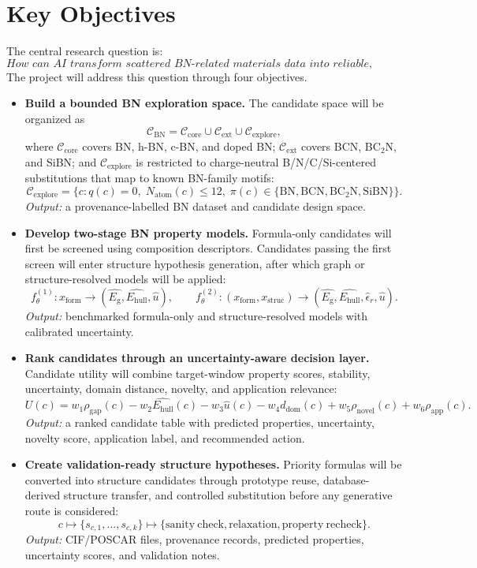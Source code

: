 \documentclass[10pt,a4paper]{article}
\newcommand{\eg}{E_{\mathrm{g}}}
\newcommand{\ehull}{E_{\mathrm{hull}}}
\newcommand{\form}{x_{\mathrm{form}}}
\newcommand{\struc}{x_{\mathrm{struc}}}
\newcommand{\unc}{u}
\newcommand{\domain}{d_{\mathrm{dom}}}
\newcommand{\utility}{U}
\newcommand{\gapscore}{\rho_{\mathrm{gap}}}
\newcommand{\appscore}{\rho_{\mathrm{app}}}
\newcommand{\novel}{\rho_{\mathrm{novel}}}
\begin{document}
\section{Key Objectives}
The central research question is:
\[
  \textit{How can AI transform scattered BN-related materials data into reliable, uncertainty-aware research decisions?}
\]
The project will address this question through four objectives.
\begin{itemize}[leftmargin=*]
  \item \textbf{Build a bounded BN exploration space.} The candidate space will be organized as
  \[
    \mathcal{C}_{\mathrm{BN}}=
    \mathcal{C}_{\mathrm{core}}\cup\mathcal{C}_{\mathrm{ext}}\cup\mathcal{C}_{\mathrm{explore}},
  \]
  where $\mathcal{C}_{\mathrm{core}}$ covers BN, h-BN, c-BN, and doped BN;
  $\mathcal{C}_{\mathrm{ext}}$ covers BCN, BC$_2$N, and SiBN; and
  $\mathcal{C}_{\mathrm{explore}}$ is restricted to charge-neutral B/N/C/Si-centered substitutions that map to known BN-family motifs:
  \[
    \mathcal{C}_{\mathrm{explore}}=
    \{c:q(c)=0,\;N_{\mathrm{atom}}(c)\le 12,\;\pi(c)\in
    \{\mathrm{BN},\mathrm{BCN},\mathrm{BC_2N},\mathrm{SiBN}\}\}.
  \]
  \textit{Output:} a provenance-labelled BN dataset and candidate design space.

  \item \textbf{Develop two-stage BN property models.} Formula-only candidates will first be screened using composition descriptors. Candidates passing the first screen will enter structure hypothesis generation, after which graph or structure-resolved models will be applied:
  \[
    f_{\theta}^{(1)}:\form\rightarrow(\hat{\eg},\hat{\ehull},\hat{\unc}),
    \qquad
    f_{\theta}^{(2)}:(\form,\struc)\rightarrow
    (\hat{\eg},\hat{\ehull},\hat{\epsilon}_r,\hat{\unc}).
  \]
  \textit{Output:} benchmarked formula-only and structure-resolved models with calibrated uncertainty.

  \item \textbf{Rank candidates through an uncertainty-aware decision layer.} Candidate utility will combine target-window property scores, stability, uncertainty, domain distance, novelty, and application relevance:
  \[
    \utility(c)=w_1\gapscore(c)-w_2\hat{\ehull}(c)-w_3\hat{\unc}(c)
    -w_4\domain(c)+w_5\novel(c)+w_6\appscore(c).
  \]
  \textit{Output:} a ranked candidate table with predicted properties, uncertainty, novelty score, application label, and recommended action.

  \item \textbf{Create validation-ready structure hypotheses.} Priority formulas will be converted into structure candidates through prototype reuse, database-derived structure transfer, and controlled substitution before any generative route is considered:
  \[
    c\mapsto\{s_{c,1},\ldots,s_{c,k}\}\mapsto
    \{\mathrm{sanity\ check},\mathrm{relaxation},\mathrm{property\ recheck}\}.
  \]
  \textit{Output:} CIF/POSCAR files, provenance records, predicted properties, uncertainty scores, and validation notes.
\end{itemize}
\end{document}
